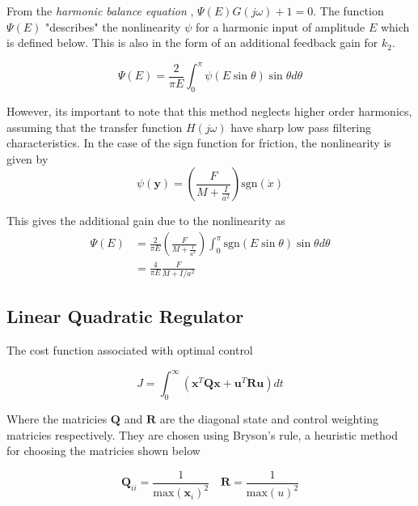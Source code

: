 \documentclass{article}
\begin{document}
From the \textit{harmonic balance equation} \cite{non_linear_systems}, $\Psi(E)G(j\omega) + 1 = 0$.
The function $\Psi(E)$ "describes" the nonlinearity $\psi$ for a harmonic input of amplitude $E$ which is defined below.
This is also in the form of an additional feedback gain for $k_2$.

\begin{equation}
  \Psi(E) = \frac{2}{\pi E} \int_0^{\pi} \psi(E\sin\theta)\sin\theta d\theta
\end{equation}

However, its important to note that this method neglects higher order harmonics, assuming that the transfer function $H(j\omega)$ have sharp low pass filtering characteristics.
In the case of the sign function for friction, the nonlinearity is given by 
\begin{equation}
  \psi(\mathbf{y}) = \left(\frac{F}{M + \frac{I}{a^2}} \right) \text{sgn}(\dot{x})
\end{equation}

This gives the additional gain due to the nonlinearity as
\begin{align}
  \Psi(E) &= \frac{2}{\pi E} \left(\frac{F}{M + \frac{I}{a^2}} \right) \int_0^{\pi} \text{sgn}(E\sin\theta)\sin\theta d\theta \\
          &= \frac{4}{\pi E} \frac{F}{M + I/{a^2}} \label{eq:additional_k2}
\end{align}


\subsection{Linear Quadratic Regulator}

The cost function associated with optimal control

\begin{equation}
  J = \int_0^\infty \left( \mathbf{x}^T \mathbf{Q} \mathbf{x} + \mathbf{u}^T \mathbf{R} \mathbf{u} \right) dt
\end{equation}

Where the matricies $\mathbf{Q}$ and $\mathbf{R}$ are the diagonal state and control weighting matricies respectively.
They are chosen using Bryson's rule, a heuristic method for choosing the matricies shown below \cite{feedback_control_of_dynamic_systems}

\begin{equation}
  \mathbf{Q}_{ii} = \frac{1}{\text{max}(\mathbf{x}_i)^2} \quad \mathbf{R} = \frac{1}{\text{max}(u)^2}
\end{equation}
\end{document}
